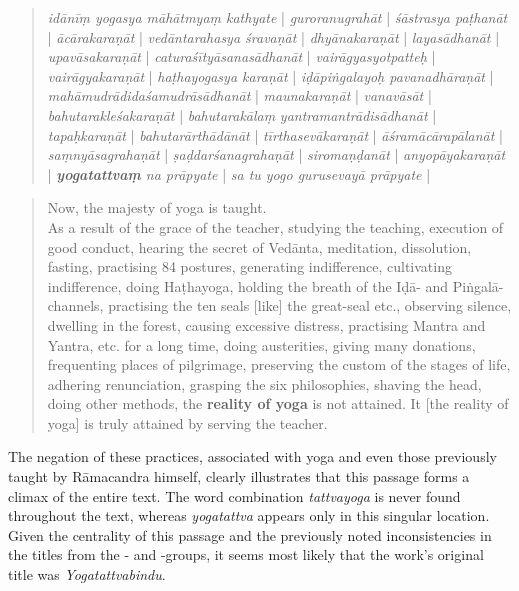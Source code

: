 \begin{quote}
  \label{mahatmya}
  \textit{idānīṃ yogasya māhātmyaṃ kathyate} |
  \textit{guroranugrahāt} | \textit{śāstrasya paṭhanāt} | \textit{ācārakaraṇāt} | \textit{vedāntarahasya śravaṇāt} |
  \textit{dhyānakaraṇāt} | \textit{layasādhanāt} | \textit{upavāsakaraṇāt} | \textit{caturaśītyāsanasādhanāt} | \textit{vairāgyasyotpatteḥ} | \textit{vairāgyakaraṇāt} | \textit{haṭhayogasya karaṇāt} | \textit{iḍāpiṅgalayoḥ pavanadhāraṇāt} | \textit{mahāmudrādidaśamudrāsādhanāt} | \textit{maunakaraṇāt} | \textit{vanavāsāt} | \textit{bahutarakleśakaraṇāt} | \textit{bahutarakālaṃ} \textit{yantramantrādisādhanāt} | \textit{tapaḥkaraṇāt} | \textit{bahutarārthādānāt} | \textit{tīrthasevākaraṇāt} | \textit{āśramācārapālanāt} | \textit{saṃnyāsagrahaṇāt} | \textit{ṣaḍdarśanagrahaṇāt} | \textit{siromaṇḍanāt} | \textit{anyopāyakaraṇāt} | \textit{\textbf{yogatattvaṃ} na prāpyate} | \textit{sa tu yogo gurusevayā prāpyate} |
\end{quote}

\begin{quote}
Now, the majesty of yoga is taught.\\ As a result of the grace of the teacher, studying the teaching, execution of good conduct, hearing the secret of Vedānta, meditation, dissolution, fasting, practising 84 postures, generating indifference, cultivating indifference, doing Haṭhayoga, holding the breath of the Iḍā- and Piṅgalā-channels, practising the ten seals [like] the great-seal etc., observing silence, dwelling in the forest, causing excessive distress, practising Mantra and Yantra, etc. for a long time, doing austerities, giving many donations, frequenting places of pilgrimage, preserving the custom of the stages of life, adhering renunciation, grasping the six philosophies, shaving the head, doing other methods, the \textbf{reality of yoga} is not attained. It [the reality of yoga] is truly attained by serving the teacher.
  \end{quote}

  The negation of these practices, associated with yoga and even those previously taught by Rāmacandra himself, clearly illustrates that this passage forms a climax of the entire text. The word combination \textit{tattvayoga} is never found throughout the text, whereas \textit{yogatattva} appears only in this singular location. Given the centrality of this passage and the previously noted inconsistencies in the titles from the \alpha- and \beta-groups, it seems most likely that the work's original title was \emph{Yogatattvabindu}.
  
